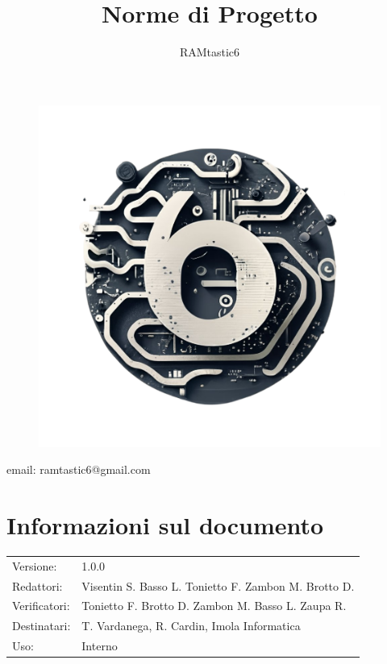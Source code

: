 \documentclass[12pt, oneside]{article}
\author{RAMtastic6}
\begin{document}
\thispagestyle{empty}
\title{Norme di Progetto}
\maketitle
\begin{figure}[h]
  \centering
  \includegraphics[scale=0.3]{logo.png}
\end{figure}
\begin{center}
    email: ramtastic6@gmail.com
\end{center}

\section*{Informazioni sul documento}
\begin{tabular}{ll}
Versione: & 1.0.0 \\
Redattori: &  Visentin S. Basso L. Tonietto F. Zambon M. Brotto D.\\
Verificatori: & Tonietto F. Brotto D. Zambon M. Basso L. Zaupa R. \\
Destinatari: & T. Vardanega, R. Cardin, Imola Informatica \\
Uso: & Interno
\end{tabular}
\newpage
\end{document}
